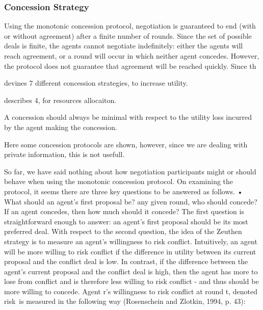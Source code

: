 \subsubsection{Concession Strategy}
\label{sec:concessionstrat}

Using the monotonic concession protocol, negotiation is guaranteed to end
(with or without agreement) after a finite number of rounds. Since the set of possible
deals is finite, the agents cannot negotiate indefinitely: either the agents will
reach agreement, or a round will occur in which neither agent concedes. However,
the protocol does not guarantee that agreement will be reached quickly. Since th

\citet{endriss2006monotonic} devines 7 different concession strategies, to increase utility. 

\citet{wu2009efficient} describes 4, for resources allocaiton. 


\citet{endriss2006monotonic} A concession should always be minimal with respect to the utility loss incurred by the agent making the concession.

\citet{endriss2006monotonic} Here some concession protocols are shown,  however, since we are dealing with private information, this is not usefull. 



So far, we have said nothing about how negotiation participants might or should
behave when using the monotonic concession protocol. On examining the protocol,
it seems there are three key questions to be answered as follows.
• What should an agent's first proposal be?
any given round, who should concede?
If an agent concedes, then how much should it concede?
The first question is straightforward enough to answer: an agent's first proposal
should be its most preferred deal.
With respect to the second question, the idea of the Zeuthen strategy is to
measure an agent's willingness to risk conflict. Intuitively, an agent will be more
willing to risk conflict if the difference in utility between its current proposal and
the conflict deal is low.
In contrast, if the difference between the agent's current proposal and the conflict
deal is high, then the agent has more to lose from conflict and is therefore
less willing to risk conflict - and thus should be more willing to concede.
Agent r's willingness to risk conflict at round t, denoted risk\, is measured in
the following way (Rosenschein and Zlotkin, 1994, p. 43):


